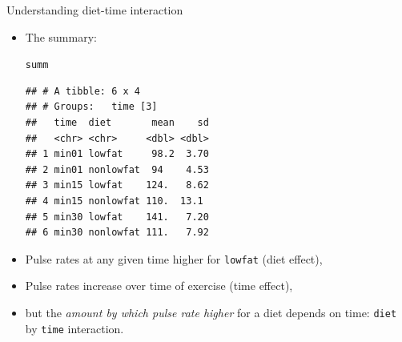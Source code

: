 \documentclass[unknownkeysallowed]{beamer}\usepackage[]{graphicx}\usepackage[]{color}
\makeatletter
\newcommand{\hlstd}[1]{\textcolor[rgb]{0.345,0.345,0.345}{#1}}%
\newenvironment{kframe}{%
 \def\at@end@of@kframe{}%
 \ifinner\ifhmode%
  \def\at@end@of@kframe{\end{minipage}}%
  \begin{minipage}{\columnwidth}%
 \fi\fi%
 \def\FrameCommand##1{\hskip\@totalleftmargin \hskip-\fboxsep
 \colorbox{shadecolor}{##1}\hskip-\fboxsep
     \hskip-\linewidth \hskip-\@totalleftmargin \hskip\columnwidth}%
 \MakeFramed {\advance\hsize-\width
   \@totalleftmargin\z@ \linewidth\hsize
   \@setminipage}}%
 {\par\unskip\endMakeFramed%
 \at@end@of@kframe}
\newenvironment{knitrout}{}{} %
\makeatother
\begin{document}
\begin{frame}[fragile]{Understanding diet-time interaction}

  \begin{itemize}
    \item The summary:
\begin{knitrout}\small
{}\color{fgcolor}\begin{kframe}
\begin{alltt}
\hlstd{summ}
\end{alltt}
\begin{verbatim}
## # A tibble: 6 x 4
## # Groups:   time [3]
##   time  diet       mean    sd
##   <chr> <chr>     <dbl> <dbl>
## 1 min01 lowfat     98.2  3.70
## 2 min01 nonlowfat  94    4.53
## 3 min15 lowfat    124.   8.62
## 4 min15 nonlowfat 110.  13.1 
## 5 min30 lowfat    141.   7.20
## 6 min30 nonlowfat 111.   7.92
\end{verbatim}
\end{kframe}
\end{knitrout}
  \item Pulse rates at any given time higher for \texttt{lowfat} (diet
  effect), 
  \item Pulse rates increase over time of exercise (time effect),
    
  \item but the \emph{amount by which pulse rate higher} for a diet depends on
  time: \texttt{diet} by \texttt{time} interaction.

  \end{itemize}
  
\end{frame}
\end{document}
